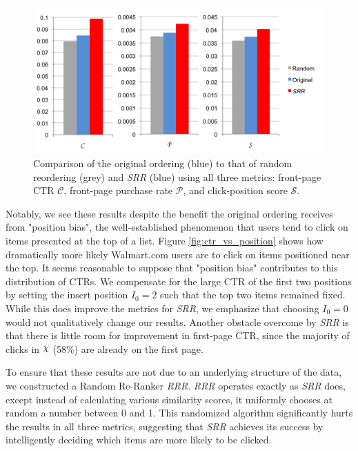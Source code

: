 \documentclass{article}
\def\Chi{\raisebox{2pt}{$\chi$}}
\begin{document}
\begin{figure}[htbp!]
    \centering
    \includegraphics[width=\textwidth]{moneyshot.png}
    \caption{Comparison of the original ordering (blue) to that of random reordering (grey) and {\em SRR} (blue) using all three metrics: front-page CTR $\mathscr{C}$, front-page purchase rate $\mathscr{P}$, and click-position score $\mathscr{S}$.}
    \label{fig:compare_metric_performance}
\end{figure}

Notably, we see these results despite the benefit the original ordering receives
from "position bias", the well-established phenomenon that users tend to click
on items presented at the top of a list. Figure \ref{fig:ctr_vs_position} shows
how dramatically more likely Walmart.com users are to click on items positioned
near the top. It seems reasonable to suppose that "position bias" contributes
to this distribution of CTRs. We compensate for the large CTR of the first two
positions by setting the insert position $I_0 = 2$ such that the top two items
remained fixed. While this does improve the metrics for {\em SRR}, we emphasize
that choosing $I_0 = 0$ would not qualitatively change our results. Another
obstacle overcome by {\em SRR} is that there is little room for improvement in
first-page CTR, since the majority of clicks in $\Chi$ (58\%) are already
on the first page.

To ensure that these results are not due to an underlying structure of the
data, we constructed a Random Re-Ranker {\em RRR}. {\em RRR} operates exactly
as {\em SRR} does, except instead of calculating various similarity scores, it
uniformly chooses at random a number between 0 and 1. This randomized algorithm
significantly hurts the results in all three metrics, suggesting that {\em SRR}
achieves its success by intelligently deciding which items are more likely to
be clicked. 
\end{document}
